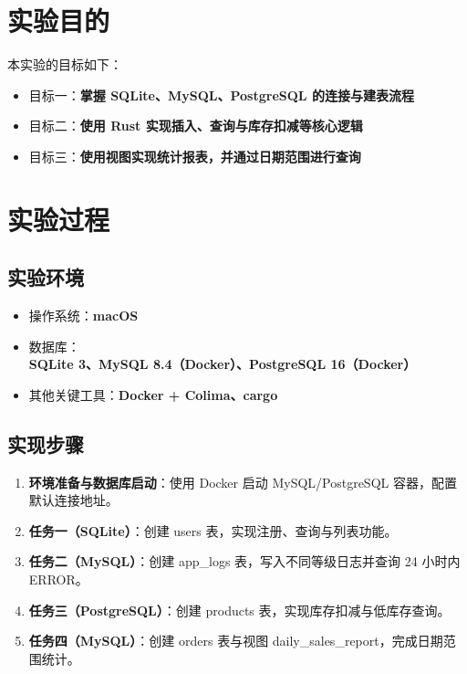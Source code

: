 \documentclass[12pt,a4paper]{ctexart}
\title{\reporttitle}
\author{\authname：\underline{李祥熙} \quad \authid：\underline{2234412799}
\date{\today}
}
\begin{document}
\maketitle

\section{实验目的}
本实验的目标如下：
\begin{itemize}
	\item 目标一：\textbf{掌握 SQLite、MySQL、PostgreSQL 的连接与建表流程}
	\item 目标二：\textbf{使用 Rust 实现插入、查询与库存扣减等核心逻辑}
	\item 目标三：\textbf{使用视图实现统计报表，并通过日期范围进行查询}
\end{itemize}

\section{实验过程}
\subsection{实验环境}
\begin{itemize}
	\item 操作系统：\textbf{macOS}
	\item 数据库：\textbf{SQLite 3、MySQL 8.4（Docker）、PostgreSQL 16（Docker）}
	\item 其他关键工具：\textbf{Docker + Colima、cargo}
\end{itemize}

\subsection{实现步骤}
\begin{enumerate}
	\item \textbf{环境准备与数据库启动}：使用 Docker 启动 MySQL/PostgreSQL 容器，配置默认连接地址。
	\item \textbf{任务一（SQLite）}：创建 users 表，实现注册、查询与列表功能。
	\item \textbf{任务二（MySQL）}：创建 app\_logs 表，写入不同等级日志并查询 24 小时内 ERROR。
	\item \textbf{任务三（PostgreSQL）}：创建 products 表，实现库存扣减与低库存查询。
	\item \textbf{任务四（MySQL）}：创建 orders 表与视图 daily\_sales\_report，完成日期范围统计。
\end{enumerate}
\end{document}
